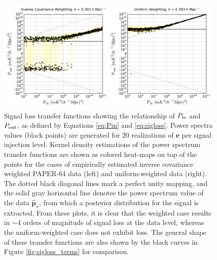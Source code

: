\documentclass[preprint2,numberedappendix,tighten]{aastex6}  %
\newcommand{\cc}[1]{{\color{purple} \textbf{[CC: #1]}}}
\begin{document}
\begin{figure}
	\centering
	\includegraphics[width=1\textwidth]{plots/sigloss_transfercurve_posneg.png}
	\caption{Signal loss transfer functions showing the relationship of $P_{\rm in}$ and $P_{\rm out}$, as defined by Equations \eqref{eq:Pin} and \eqref{eq:sigloss}. Power spectra values (black points) are generated for $20$ realizations of $\textbf{e}$ per signal injection level. Kernel density estimations of the power spectrum transfer functions are shown as colored 
heat-maps on top of the points for the cases of empirically estimated inverse covariance weighted PAPER-64 data (left) and uniform-weighted data (right). The dotted black 
diagonal lines mark a perfect unity mapping, and the solid gray horizontal line denotes the power spectrum value of the data $\widehat{\textbf{p}}_{x}$, from which a posterior distribution for the signal is extracted. From these plots, it is clear that the weighted case results in $\sim4$ orders of magnitude of signal loss at the data level, whereas the uniform-weighted case does 
not exhibit loss. The general shape of these transfer functions are also shown by the black curves in Figure \ref{fig:sigloss_terms} for comparison.}
	\label{fig:sigloss_transfercurve}
\end{figure}

%
\end{document}
